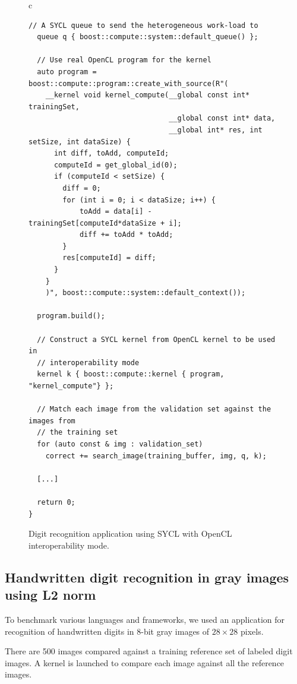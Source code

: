 \documentclass[sigplan]{acmart}
\begin{document}
\begin{figure}
\begin{tabular}{c}
\begin{lstlisting}[basicstyle=\scriptsize]
  // A SYCL queue to send the heterogeneous work-load to
  queue q { boost::compute::system::default_queue() };

  // Use real OpenCL program for the kernel
  auto program = boost::compute::program::create_with_source(R"(
    __kernel void kernel_compute(__global const int* trainingSet,
                                 __global const int* data,
                                 __global int* res, int setSize, int dataSize) {
      int diff, toAdd, computeId;
      computeId = get_global_id(0);
      if (computeId < setSize) {
        diff = 0;
        for (int i = 0; i < dataSize; i++) {
            toAdd = data[i] - trainingSet[computeId*dataSize + i];
            diff += toAdd * toAdd;
        }
        res[computeId] = diff;
      }
    }
    )", boost::compute::system::default_context());

  program.build();

  // Construct a SYCL kernel from OpenCL kernel to be used in
  // interoperability mode
  kernel k { boost::compute::kernel { program, "kernel_compute"} };

  // Match each image from the validation set against the images from
  // the training set
  for (auto const & img : validation_set)
    correct += search_image(training_buffer, img, q, k);

  [...]

  return 0;
}
    \end{lstlisting}
  \end{tabular}
  \caption{Digit recognition application using SYCL with OpenCL
    interoperability mode.\label{fig:digit-SYCL-OpenCL-code}}
\end{figure}


\subsection{Handwritten digit recognition in gray images using L2
  norm}
\label{sec:example-from-anast}

To benchmark various languages and frameworks, we used an application
for recognition of handwritten digits in 8-bit gray images of
$28 \times 28$ pixels.

There are 500 images compared against a training reference
set of labeled digit images. A kernel is launched to compare each
image against all the reference images.
\end{document}
